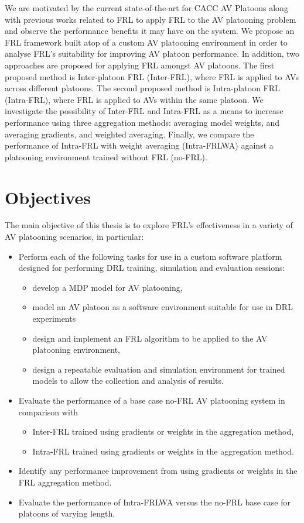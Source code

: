 We are motivated by the current state-of-the-art for CACC AV Platoons along with previous works related to FRL to apply FRL to the AV platooning problem and observe the performance benefits it may have on the system.  We propose an FRL framework built atop of a custom AV platooning environment in order to analyse FRL's suitability for improving AV platoon performance.  In addition, two approaches are proposed for applying FRL amongst AV platoons. The first proposed method is Inter-platoon FRL (Inter-FRL), where FRL is applied to AVs across different platoons.  The second proposed method is Intra-platoon FRL (Intra-FRL), where FRL is applied to AVs within the same platoon.  We investigate the possibility of Inter-FRL and Intra-FRL as a means to increase performance using three aggregation methods: averaging model weights, and averaging gradients, and weighted averaging.  Finally, we compare the performance of Intra-FRL with weight averaging (Intra-FRLWA) against a platooning environment trained without FRL (no-FRL).

\section{Objectives}
The main objective of this thesis is to explore FRL's effectiveness in a variety of AV platooning scenarios, in particular:

\begin{itemize}
    \item Perform each of the following tasks for use in a custom software platform designed for performing DRL training, simulation and evaluation sessions:
        \begin{itemize}
            \item develop a MDP model for AV platooning, 
            \item model an AV platoon as a software environment suitable for use in DRL experiments
            \item design and implement an FRL algorithm to be applied to the AV platooning environment, 
            \item design a repeatable evaluation and simulation environment for trained models to allow the collection and analysis of results.
        \end{itemize}
    \item Evaluate the performance of a base case no-FRL AV platooning system in comparison with
        \begin{itemize}
            \item Inter-FRL trained using gradients or weights in the aggregation method,
            \item Intra-FRL trained using gradients or weights in the aggregation method.
        \end{itemize}
    \item Identify any performance improvement from using gradients or weights in the FRL aggregation method.
    \item Evaluate the performance of Intra-FRLWA versus the no-FRL base case for platoons of varying length.
\end{itemize}

